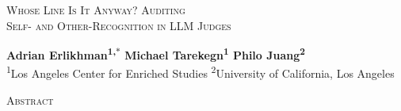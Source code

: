 \documentclass[10pt]{article}
\begin{document}
\thispagestyle{plain}

\vspace*{0.35in}
{\Large\scshape Whose Line Is It Anyway? Auditing\\[2pt]
Self- and Other-Recognition in LLM Judges\par}
\vspace{0.3in}
{\bfseries Adrian Erlikhman\textsuperscript{1,$\ast$}
\qquad Michael Tarekegn\textsuperscript{1} \qquad Philo Juang\textsuperscript{2}}\\[1pt]
\textsuperscript{1}Los Angeles Center for Enriched Studies \qquad
\textsuperscript{2}University of California, Los Angeles
{\let\thefootnote\relax{}}
\vspace{0.3in}

\begin{center}{\large\scshape Abstract}\end{center}
\vspace{-6pt}
\begin{quote}

\end{quote}
\vspace{6pt}











\clearpage
\clearpage
\appendix
\makeatletter
\renewenvironment{table}[1][]{\@float{table}[!ht]}{\end@float}
\makeatother

\end{document}
